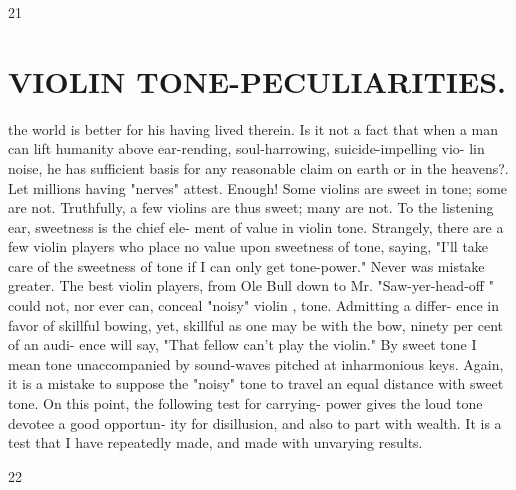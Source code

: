 \documentclass{article}
\begin{document}
21

\section*{VIOLIN TONE-PECULIARITIES.}
the world is better for his having lived therein. Is it not a fact that when a man can lift humanity above ear-rending, soul-harrowing, suicide-impelling vio- lin noise, he has sufficient basis for any reasonable claim on earth or in the heavens?. Let millions having "nerves" attest. Enough! Some violins are sweet in tone; some are not. Truthfully, a few violins are thus sweet; many are not. To the listening ear, sweetness is the chief ele- ment of value in violin tone. Strangely, there are a few violin players who place no value upon sweetness of tone, saying, "I'll take care of the sweetness of tone if I can only get tone-power." Never was mistake greater. The best violin players, from Ole Bull down to Mr. "Saw-yer-head-off " could not, nor ever can, conceal "noisy" violin , tone. Admitting a differ- ence in favor of skillful bowing, yet, skillful as one may be with the bow, ninety per cent of an audi- ence will say, "That fellow can't play the violin." By sweet tone I mean tone unaccompanied by sound-waves pitched at inharmonious keys. Again, it is a mistake to suppose the "noisy" tone to travel an equal distance with sweet tone. On this point, the following test for carrying- power gives the loud tone devotee a good opportun- ity for disillusion, and also to part with wealth. It is a test that I have repeatedly made, and made with unvarying results.

22
\end{document}
